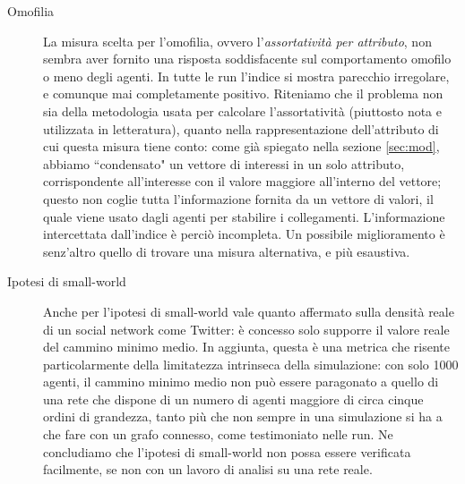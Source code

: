 \documentclass[a4paper,12pt]{article}
\begin{document}
\begin{description}
\item[Omofilia] La misura scelta per l'omofilia, ovvero l'\textit{assortatività per attributo}, non sembra aver fornito una risposta soddisfacente sul comportamento omofilo o meno degli agenti. In tutte le run l'indice si mostra parecchio irregolare, e comunque mai completamente positivo. Riteniamo che il problema non sia della metodologia usata per calcolare l'assortatività (piuttosto nota e utilizzata in letteratura), quanto nella rappresentazione dell'attributo di cui questa misura tiene conto: come già spiegato nella sezione \ref{sec:mod}, abbiamo ``condensato" un vettore di interessi in un solo attributo, corrispondente all'interesse con il valore maggiore all'interno del vettore; questo non coglie tutta l'informazione fornita da un vettore di valori, il quale viene usato dagli agenti per stabilire i collegamenti. L'informazione intercettata dall'indice è perciò incompleta. Un possibile miglioramento è senz'altro quello di trovare una misura alternativa, e più esaustiva.
\item[Ipotesi di small-world] Anche per l'ipotesi di small-world vale quanto affermato sulla densità reale di un social network come Twitter: è concesso solo supporre il valore reale del cammino minimo medio. In aggiunta, questa è una metrica che risente particolarmente della limitatezza intrinseca della simulazione: con solo 1000 agenti, il cammino minimo medio non può essere paragonato a quello di una rete che dispone di un numero di agenti maggiore di circa cinque ordini di grandezza, tanto più che non sempre in una simulazione si ha a che fare con un grafo connesso, come testimoniato nelle run. Ne concludiamo che l'ipotesi di small-world non possa essere verificata facilmente, se non con un lavoro di analisi su una rete reale. 
\end{description}
\end{document}
